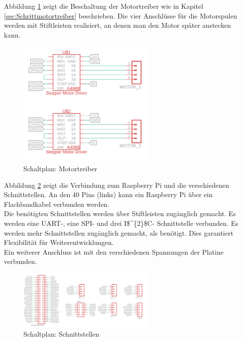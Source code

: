Abbildung \ref{driver} zeigt die Beschaltung der Motortreiber wie in Kapitel \ref{sec:Schrittmotortreiber} beschrieben. Die vier Anschlüsse für die Motorspulen werden mit Stiftleisten realisiert, an denen man den Motor später anstecken kann.

\begin{figure}[H]
	\centering
	\includegraphics[width=0.6\textwidth]{images/Hardware/Schaltplan/Driver}
	\caption{Schaltplan: Motortreiber}
	\label{driver}
\end{figure}

Abbildung \ref{schnittstellen} zeigt die Verbindung zum Raspberry Pi und die verschiedenen Schnittstellen. An den 40 Pins (links) kann ein Raspberry Pi über ein Flachbandkabel verbunden werden. \\
Die benötigten Schnittstellen werden über Stiftleisten zugänglich gemacht. Es werden eine \ac{UART}-, eine \ac{SPI}- und drei \ac{I$^{2}$C}- Schnittstelle verbunden. Es werden mehr Schnittstellen zugänglich gemacht, als benötigt. Dies garantiert Flexibilität für Weiterentwicklungen. \\
Ein weiterer Anschluss ist mit den verschiedenen Spannungen der Platine verbunden. 

\begin{figure}[H]
	\centering
	\includegraphics[width=0.6\textwidth]{images/Hardware/Schaltplan/Schnittstellen}
	\caption{Schaltplan: Schnittstellen}
	\label{schnittstellen}
\end{figure}


